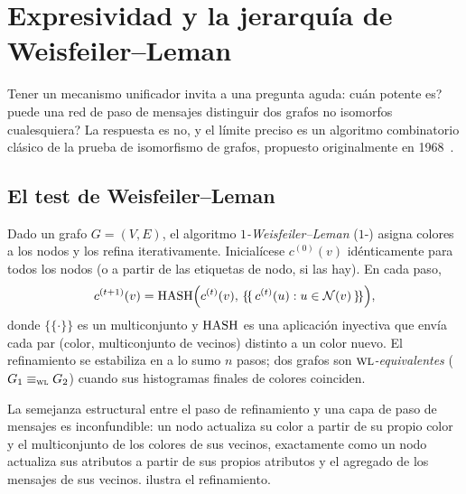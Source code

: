 \section{Expresividad y la jerarqu\'ia de Weisfeiler--Leman}
\label{sec:graphs:wl}

Tener un mecanismo unificador invita a una pregunta aguda:
\textquestiondown cu\'an potente es? \textquestiondown puede una red de paso de
mensajes distinguir dos grafos no isomorfos cualesquiera? La respuesta es no, y el
l\'imite preciso es un algoritmo combinatorio cl\'asico de la prueba de
isomorfismo de grafos, propuesto originalmente en
1968~\citep{weisfeiler1968reduction}.

\subsection{El test de Weisfeiler--Leman}
\label{sec:graphs:wl-test}

\begin{definition}
\label{def:graphs:wl}
Dado un grafo $G = (V, E)$, el algoritmo \emph{$1$-Weisfeiler--Leman} ($1$-\WL)
asigna colores a los nodos y los refina iterativamente. Inicial\'icese
$c^{(0)}(v)$ id\'enticamente para todos los nodos (o a partir de las etiquetas de
nodo, si las hay). En cada paso,
\[
  c^{(t+1)}(v) = \operatorname{HASH}\!\Big(c^{(t)}(v),\,
      \{\!\{\, c^{(t)}(u) : u \in \mathcal{N}(v) \,\}\!\}\Big),
\]
donde $\{\!\{\cdot\}\!\}$ es un multiconjunto y $\operatorname{HASH}$ es una aplicaci\'on
inyectiva que env\'ia cada par (color, multiconjunto de vecinos) distinto a un
color nuevo. El refinamiento se estabiliza en a lo sumo $n$ pasos; dos grafos son
\emph{$\textsc{wl}$-equivalentes} ($G_1 \equiv_{\textsc{wl}} G_2$) cuando sus histogramas finales
de colores coinciden.
\end{definition}

La semejanza estructural entre el paso de refinamiento y una capa de paso de
mensajes es inconfundible: un nodo actualiza su color a partir de su propio color
y el multiconjunto de los colores de sus vecinos, exactamente como un nodo
actualiza sus atributos a partir de sus propios atributos y el agregado de los
mensajes de sus vecinos.  ilustra el refinamiento.

